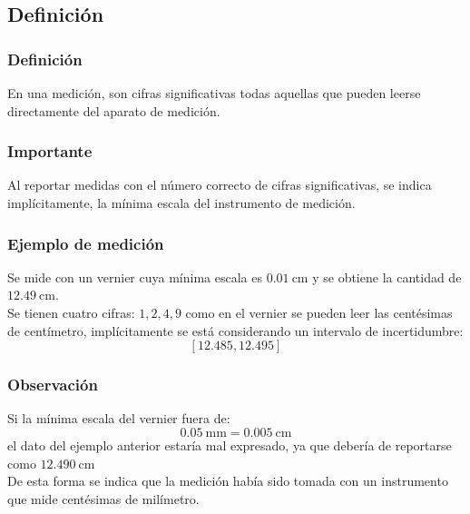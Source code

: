 \subsection{Definición}
\begin{frame}
\frametitle{Definición}
En una medición, son cifras significativas todas aquellas que pueden leerse directamente del aparato de medición.
\end{frame}
\begin{frame}
\frametitle{Importante}
Al reportar medidas con el número correcto de cifras significativas, se indica implícitamente, la mínima escala del instrumento de medición.
\end{frame}
\begin{frame}
\frametitle{Ejemplo de medición}
Se mide con un vernier cuya mínima escala es $\SI{0.01}{\cm}$ y se obtiene la cantidad de $\SI{12.49}{\cm}$.
\\
\bigskip
\pause
Se tienen cuatro cifras: $1, 2, 4, 9$ como en el vernier se pueden leer las centésimas de centímetro, implícitamente se está considerando un intervalo de incertidumbre:
\[ [12.485, 12.495] \]
\end{frame}
\begin{frame}
\frametitle{Observación}
Si la mínima escala del vernier fuera de:
\[ \SI{0.05}{\mm} = \SI{0.005}{\cm} \]
el dato del ejemplo anterior estaría mal expresado, ya que debería de reportarse como $\SI{12.490}{\cm}$
\\
\bigskip
\pause
De esta forma se indica que la medición había sido tomada con un instrumento que mide centésimas de milímetro.
\end{frame}
